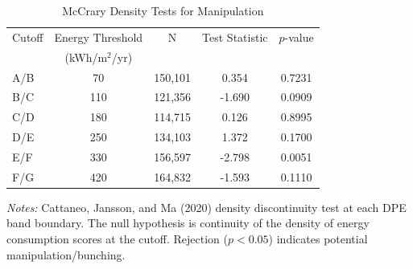 \begin{table}[htbp]
\centering
\caption{McCrary Density Tests for Manipulation}
\label{tab:mccrary}
\begin{tabular}{l c c c c}
\hline\hline
Cutoff & Energy Threshold & N & Test Statistic & $p$-value \\
 & (kWh/m$^2$/yr) & & & \\
\hline
A/B & 70 & 150,101 & 0.354 & 0.7231 \\
B/C & 110 & 121,356 & -1.690 & 0.0909 \\
C/D & 180 & 114,715 & 0.126 & 0.8995 \\
D/E & 250 & 134,103 & 1.372 & 0.1700 \\
E/F & 330 & 156,597 & -2.798 & 0.0051 \\
F/G & 420 & 164,832 & -1.593 & 0.1110 \\
\hline\hline
\end{tabular}
\begin{minipage}{0.9\textwidth}
\small\textit{Notes:} Cattaneo, Jansson, and Ma (2020) density discontinuity test at each DPE band boundary. The null hypothesis is continuity of the density of energy consumption scores at the cutoff. Rejection ($p < 0.05$) indicates potential manipulation/bunching.
\end{minipage}
\end{table}
